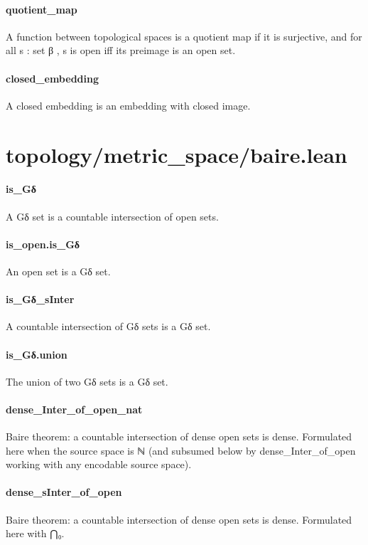 \documentclass{article}
\begin{document}
\paragraph{quotient\_map}
\par
A function between topological spaces is a quotient map if it is surjective,
and for all 
\colorbox[RGB]{253,246,227}{{{{\color[RGB]{101, 123, 131} s : set β }}}}, 
\colorbox[RGB]{253,246,227}{{{{\color[RGB]{101, 123, 131} s }}}} is open iff its preimage is an open set.
\paragraph{closed\_embedding}
\par
A closed embedding is an embedding with closed image.
\section{topology/metric\_space/baire.lean}\paragraph{is\_Gδ}
\par
A Gδ set is a countable intersection of open sets.
\paragraph{is\_open.is\_Gδ}
\par
An open set is a Gδ set.
\paragraph{is\_Gδ\_sInter}
\par
A countable intersection of Gδ sets is a Gδ set.
\paragraph{is\_Gδ.union}
\par
The union of two Gδ sets is a Gδ set.
\paragraph{dense\_Inter\_of\_open\_nat}
\par
Baire theorem: a countable intersection of dense open sets is dense. Formulated here when
the source space is ℕ (and subsumed below by 
\colorbox[RGB]{253,246,227}{{{{\color[RGB]{101, 123, 131} dense\_Inter\_of\_open }}}} working with any
encodable source space).
\paragraph{dense\_sInter\_of\_open}
\par
Baire theorem: a countable intersection of dense open sets is dense. Formulated here with ⋂₀.
\end{document}

